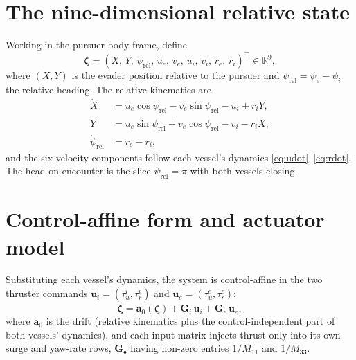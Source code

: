 \documentclass[11pt]{article}
\newcommand{\R}{\mathbb{R}}
\newcommand{\zvec}{\boldsymbol{\zeta}}
\begin{document}
\section{The nine-dimensional relative state}
Working in the pursuer body frame, define
\begin{equation}
\zvec=(X,\,Y,\,\psi_{\mathrm{rel}},\,u_e,\,v_e,\,u_i,\,v_i,\,r_e,\,r_i)^{\top}\in\R^{9},
\end{equation}
where $(X,Y)$ is the evader position relative to the pursuer and
$\psi_{\mathrm{rel}}=\psi_e-\psi_i$ the relative heading. The relative kinematics
are
\begin{align}
\dot X &= u_e\cos\psi_{\mathrm{rel}} - v_e\sin\psi_{\mathrm{rel}} - u_i + r_i Y,\\
\dot Y &= u_e\sin\psi_{\mathrm{rel}} + v_e\cos\psi_{\mathrm{rel}} - v_i - r_i X,\\
\dot\psi_{\mathrm{rel}} &= r_e - r_i,
\end{align}
and the six velocity components follow each vessel's dynamics
\eqref{eq:udot}--\eqref{eq:rdot}. The head-on encounter is the slice
$\psi_{\mathrm{rel}}=\pi$ with both vessels closing.

\begin{center}
\end{center}

\section{Control-affine form and actuator model}
Substituting each vessel's dynamics, the system is control-affine in the two
thruster commands $\mathbf{u}_i=(\tau_u^i,\tau_r^i)$ and
$\mathbf{u}_e=(\tau_u^e,\tau_r^e)$:
\begin{equation}
\dot{\zvec}= \mathbf{a}_0(\zvec) + \mathbf{G}_i\,\mathbf{u}_i + \mathbf{G}_e\,\mathbf{u}_e ,
\end{equation}
where $\mathbf{a}_0$ is the drift (relative kinematics plus the control-independent
part of both vessels' dynamics), and each input matrix injects thrust only into
its own surge and yaw-rate rows,
$\mathbf{G}_\bullet$ having non-zero entries $1/M_{11}$ and $1/M_{33}$.
\end{document}
